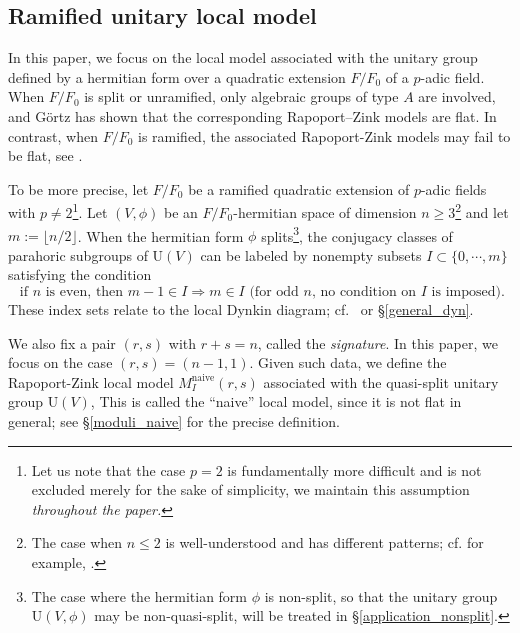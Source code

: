 \documentclass[pdflatex,sn-mathphys-num]{sn-jnl}%
\theoremstyle{thmstyleone}%
\theoremstyle{thmstyletwo}%
\numberwithin{equation}{subsection}
\theoremstyle{thmstylethree}%
\newcommand{\naive}{\ensuremath{\mathrm{naive}}\xspace}
\newcommand{\U}{\mathrm{U}}
\begin{document}
\subsection{Ramified unitary local model}\label{intro_ramified-unitary-lm}
In this paper, we focus on the local model associated with the unitary group defined by a hermitian form over a quadratic extension $F/F_0$ of a $p$-adic field. 
When $F/F_0$ is split or unramified, only algebraic groups of type $A$ are involved, and G\"ortz \cite{Gortz2001} has shown that the corresponding Rapoport–Zink models are flat.
In contrast, when $F/F_0$ is ramified, the associated Rapoport-Zink models may fail to be flat, see \cite{Pappas2000}.
		
To be more precise, let $F/F_0$ be a ramified quadratic extension of $p$-adic fields with $p\neq 2$\footnote{Let us note that the case $p=2$ is fundamentally more difficult and is not excluded merely for the sake of simplicity, we maintain this assumption \emph{throughout the paper.}}. 
Let $(V,\phi)$ be an $F/F_0$-hermitian space of dimension $n\geq 3$\footnote{The case when $n\leq 2$ is well-understood and has different patterns; cf. for example, \cite[\S 8]{RSZ2018}.} and let $m:=\lfloor n/2\rfloor$. When the hermitian form $\phi$ splits\footnote{The case where the hermitian form $\phi$ is non-split, so that the unitary group $\U(V,\phi)$ may be non-quasi-split, will be treated in \S \ref{application_nonsplit}.}, the conjugacy classes of parahoric subgroups of $\U(V)$ can be labeled by nonempty subsets $I\subset \{0,\cdots,m\}$ satisfying the condition
\begin{equation}\label{intro_back:local-dynkin}
	\text{ if }n\text{ is even, then }m-1\in I\Rightarrow m\in I
	\text{ (for odd $n$, no condition on $I$ is imposed)}.
\end{equation}
These index sets relate to the local Dynkin diagram; cf.\ \cite[4.a]{PR2008} or \S \ref{general_dyn}.

We also fix a pair $(r,s)$ with $r+s=n$, called the \emph{signature}. In this paper, we focus on the case $(r,s)=(n-1,1)$. 
Given such data, we define the Rapoport-Zink local model $M_I^{\naive}(r,s)$ associated with the quasi-split unitary group $\U(V)$, 
This is called the ``naive'' local model, since it is not flat in general; see \S \ref{moduli_naive} for the precise definition. 
		
\end{document}
